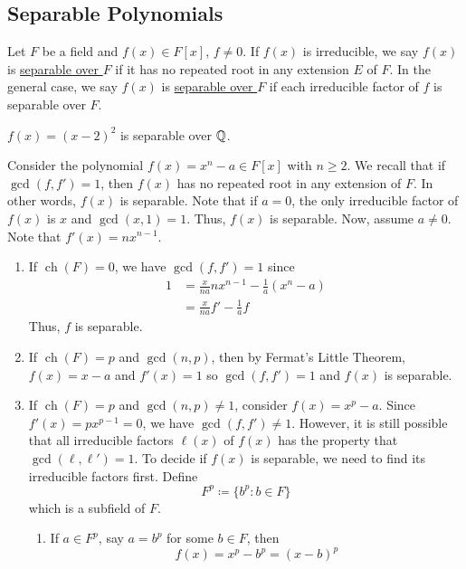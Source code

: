 \documentclass[11pt]{article}
\DeclareMathOperator{\ch}{ch}
\begin{document}
\subsection{Separable Polynomials}
\begin{definition}
Let $F$ be a field and $f(x) \in F[x]$, $f \neq 0$. If $f(x)$ is irreducible, we
say $f(x)$ is \underline{separable over $F$} if it has no repeated root in any
extension $E$ of $F$. In the general case, we say $f(x)$ is \underline{separable
over $F$} if each irreducible factor of $f$ is separable over $F$.
\end{definition}
\begin{example}
$f(x) = (x-2)^2$ is separable over $\mathbb{Q}$.
\end{example}
\begin{example}
Consider the polynomial $f(x) = x^n - a \in F[x]$ with $n \geq 2$. We recall
that if $\gcd(f, f') = 1$, then $f(x)$ has no repeated root in any extension of
$F$. In other words, $f(x)$ is separable. Note that if $a = 0$, the only
irreducible factor of $f(x)$ is $x$ and $\gcd(x, 1) = 1$. Thus, $f(x)$ is
separable. Now, assume $a \neq 0$. Note that $f'(x) = nx^{n-1}$.
\begin{enumerate}
\item If $\ch(F) = 0$, we have $\gcd(f,f') = 1$ since
\begin{align*}
1 &= \frac{x}{na}nx^{n-1} - \frac{1}{a}(x^n-a)\\
&= \frac{x}{na}f' - \frac{1}{a}f
\end{align*}
Thus, $f$ is separable.
\item If $\ch(F) = p$ and $\gcd(n,p)$, then by Fermat's Little Theorem, $f(x) =
x - a$ and $f'(x) = 1$ so $\gcd(f,f') = 1$ and $f(x)$ is separable.
\item If $\ch(F) = p$ and $\gcd(n,p) \neq 1$, consider $f(x) = x^p - a$. Since
$f'(x) = px^{p-1} = 0$, we have $\gcd(f,f') \neq 1$. However, it is still
possible that all irreducible factors $\ell(x)$ of $f(x)$ has the property that
$\gcd(\ell, \ell') = 1$. To decide if $f(x)$ is separable, we need to find its
irreducible factors first. Define
\begin{equation*}
F^p \coloneqq \{b^p : b \in F\}
\end{equation*}
which is a subfield of $F$.
\begin{enumerate}
\item If $a \in F^p$, say $a = b^p$ for some $b \in F$, then
\begin{equation*}
f(x) = x^p - b^p = (x-b)^p \tag{by Binomial Theorem}

\end{equation*}
\end{enumerate}
\end{enumerate}
\end{example}
\end{document}
